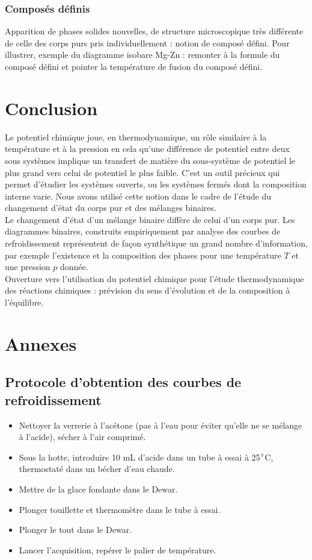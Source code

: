 \documentclass[11pt,a4paper]{report}
\begin{document}
\subsubsection{Composés définis}

Apparition de phases solides nouvelles, de structure microscopique très différente de celle des corps purs pris individuellement : notion de composé défini. Pour illustrer, exemple du diagramme isobare Mg-Zn : remonter à la formule du composé défini et pointer la température de fusion du composé défini.\\

\section*{Conclusion}

Le potentiel chimique joue, en thermodynamique, un rôle similaire à la température et à la pression en cela qu'une différence de potentiel entre deux sous systèmes implique un transfert de matière du sous-système de potentiel le plus grand vers celui de potentiel le plus faible. C'est un outil précieux qui permet d'étudier les systèmes ouverts, ou les systèmes fermés dont la composition interne varie. Nous avons utilisé cette notion dans le cadre de l'étude du changement d'état du corps pur et des mélanges binaires.\\

Le changement d'état d'un mélange binaire diffère de celui d'un corps pur. Les diagrammes binaires, construits empiriquement par analyse des courbes de refroidissement représentent de façon synthétique un grand nombre d'information, par exemple l'existence et la composition des phases pour une température $T$ et une pression $p$ donnée.\\

Ouverture vers l'utilisation du potentiel chimique pour l'étude thermodynamique des réactions chimiques : prévision du sens d'évolution et de la composition à l'équilibre.

\newpage
\section*{Annexes}
\subsection{Protocole d'obtention des courbes de refroidissement}
\begin{itemize}
	\item Nettoyer la verrerie à l'acétone (pas à l'eau pour éviter qu'elle ne se mélange à 				l'acide), sécher à l'air comprimé.
	\item Sous la hotte, introduire 10 mL d'acide dans un tube à essai à 25$\degree$C, thermostaté 			dans un bécher d'eau chaude.
	\item Mettre de la glace fondante dans le Dewar.
	\item Plonger touillette et thermomètre dans le tube à essai.
	\item Plonger le tout dans le Dewar.
	\item Lancer l'acquisition, repérer le palier de température.	
\end{itemize}
\end{document}
